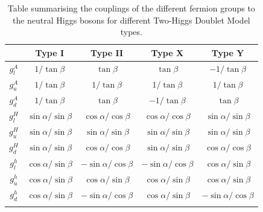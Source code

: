 \begin{table}[!htbp]
\centering
\renewcommand{\arraystretch}{1.5} %
\setlength{\tabcolsep}{12pt} %
\begin{tabular}{|c|c|c|c|c|}
\hline
        & Type I                     & Type II                     & Type X                                        & Type Y                      \\ \hline \hline
$g_l^A$ & $1/\tan{\beta}$            & $\tan{\beta}$               & $\tan{\beta}$    & $-1/\tan{\beta}$            \\ \arrayrulecolor{lightgray} \hline
$g_u^A$ & $1/\tan{\beta}$            & $1/\tan{\beta}$             & $1/\tan{\beta}$                               & $1/\tan{\beta}$             \\ \arrayrulecolor{lightgray} \hline
$g_d^A$ & $1/\tan{\beta}$            & $\tan{\beta}$               & $-1/\tan{\beta}$                              & $\tan{\beta}$               \\ \arrayrulecolor{lightgray} \hline
$g_l^H$ & $\sin{\alpha}/\sin{\beta}$ & $\cos{\alpha}/\cos{\beta}$  & $\cos{\alpha}/\cos{\beta}$                    & $\sin{\alpha}/\sin{\beta}$  \\ \arrayrulecolor{lightgray} \hline
$g_u^H$ & $\sin{\alpha}/\sin{\beta}$ & $\sin{\alpha}/\sin{\beta}$  & $\sin{\alpha}/\sin{\beta}$                    & $\sin{\alpha}/\sin{\beta}$  \\ \arrayrulecolor{lightgray} \hline
$g_d^H$ & $\sin{\alpha}/\sin{\beta}$ & $\cos{\alpha}/\cos{\beta}$  & $\sin{\alpha}/\sin{\beta}$                    & $\cos{\alpha}/\cos{\beta}$  \\ \arrayrulecolor{lightgray} \hline
$g_l^h$ & $\cos{\alpha}/\sin{\beta}$ & $-\sin{\alpha}/\cos{\beta}$ & $-\sin{\alpha}/\cos{\beta}$                   & $\cos{\alpha}/\sin{\beta}$  \\ \arrayrulecolor{lightgray} \hline
$g_u^h$ & $\cos{\alpha}/\sin{\beta}$ & $\cos{\alpha}/\sin{\beta}$  & $\cos{\alpha}/\sin{\beta}$                    & $\cos{\alpha}/\sin{\beta}$  \\ \arrayrulecolor{lightgray} \hline
$g_d^h$ & $\cos{\alpha}/\sin{\beta}$ & $-\sin{\alpha}/\cos{\beta}$ & $\cos{\alpha}/\sin{\beta}$                    & $-\sin{\alpha}/\cos{\beta}$ \\ \arrayrulecolor{black} \hline
\end{tabular}
\caption{Table summarising the couplings of the different fermion groups to the neutral Higgs bosons for different Two-Higgs Doublet Model types.}
\label{Table:Chapter2_2HDM-Couplings}
\end{table}


